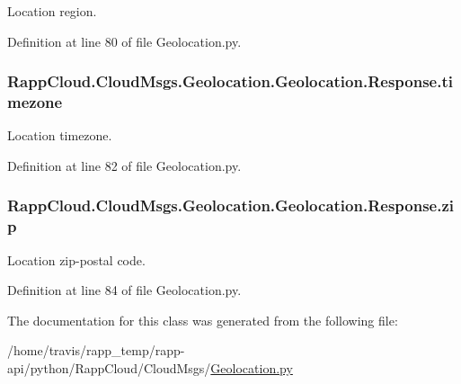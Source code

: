 Location region. 



Definition at line 80 of file Geolocation.\-py.

\hypertarget{classRappCloud_1_1CloudMsgs_1_1Geolocation_1_1Geolocation_1_1Response_ae4b84a77b2e81fa077ee868491950f11}{
\subsubsection[{timezone}]{\setlength{\rightskip}{0pt plus 5cm}Rapp\-Cloud.\-Cloud\-Msgs.\-Geolocation.\-Geolocation.\-Response.\-timezone}}\label{classRappCloud_1_1CloudMsgs_1_1Geolocation_1_1Geolocation_1_1Response_ae4b84a77b2e81fa077ee868491950f11}


Location timezone. 



Definition at line 82 of file Geolocation.\-py.

\hypertarget{classRappCloud_1_1CloudMsgs_1_1Geolocation_1_1Geolocation_1_1Response_a9ab44ed7266d4683b1b8b899f4f566a1}{
\subsubsection[{zip}]{\setlength{\rightskip}{0pt plus 5cm}Rapp\-Cloud.\-Cloud\-Msgs.\-Geolocation.\-Geolocation.\-Response.\-zip}}\label{classRappCloud_1_1CloudMsgs_1_1Geolocation_1_1Geolocation_1_1Response_a9ab44ed7266d4683b1b8b899f4f566a1}


Location zip-\/postal code. 



Definition at line 84 of file Geolocation.\-py.



The documentation for this class was generated from the following file\-:\begin{DoxyCompactItemize}
\item 
/home/travis/rapp\-\_\-temp/rapp-\/api/python/\-Rapp\-Cloud/\-Cloud\-Msgs/\hyperlink{Geolocation_8py}{Geolocation.\-py}\end{DoxyCompactItemize}

